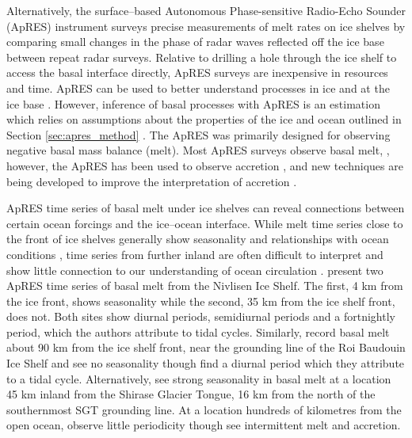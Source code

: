 Alternatively, the surface--based Autonomous Phase-sensitive Radio-Echo Sounder (ApRES) instrument surveys precise measurements of melt rates on ice shelves by comparing small changes in the phase of radar waves reflected off the ice base between repeat radar surveys. 
Relative to drilling a hole through the  ice shelf to access the basal interface directly, ApRES surveys are inexpensive in resources and time. ApRES can be used to better understand processes in ice \citep[e.g.][]{case2022phase} and at the ice base \citep[e.g.][]{sun2019topographic}.  However, inference of basal processes with ApRES is an estimation which relies on assumptions about the properties of the ice and ocean outlined in Section \ref{sec:apres_method} \citep{brennan2014phase}.
The ApRES was primarily designed for observing negative basal mass balance (melt). Most ApRES surveys observe basal melt, \citep[e.g.][] {lindback2019spatial,davis2018variability}, however, the ApRES has been used to observe accretion \citep[e.g.][] {stewart2018ice}, and new techniques are being developed to improve the interpretation of accretion \citep{vavnkova2020observations}. 


ApRES time series of basal melt under ice shelves can reveal connections between certain ocean forcings and the ice--ocean interface. While melt time series close to the front of ice shelves generally show seasonality and relationships with ocean conditions \citep[e.g.][]{lindback2019spatial}, time series from further inland are often difficult to interpret and show little connection to our understanding of ocean circulation \citep[e.g.][]{davis2018variability}. 
\cite{lindback2019spatial} present two ApRES time series of basal melt from the Nivlisen Ice Shelf. The first, 4 km from the ice front, shows seasonality while the second, 35 km from the  ice shelf front, does not. Both sites show diurnal periods, semidiurnal periods and a fortnightly period, which the authors attribute to tidal cycles. 
Similarly, \citet{sun2019topographic} record basal melt about 90 km from the  ice shelf front, near the grounding line of the Roi Baudouin Ice Shelf and see no seasonality though find a diurnal period which they attribute to a tidal cycle. 
Alternatively, \cite{hirano2020strong} see strong seasonality in basal melt at a location 45 km inland from the Shirase Glacier Tongue, 16 km from the north of the southernmost SGT grounding line.
At a location hundreds of kilometres from the open ocean, \citet{vavnkova2020observations} observe little periodicity though see intermittent melt and accretion. 


